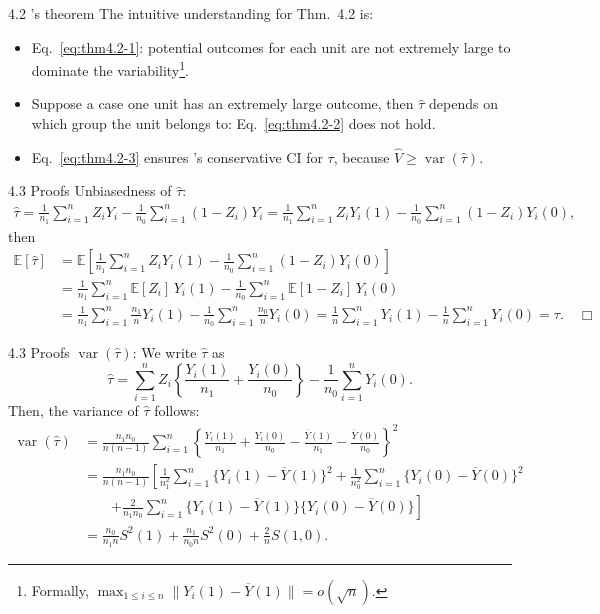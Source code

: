 \documentclass[aspectratio=169, 12pt]{beamer}
\begin{document}
\begin{frame}{4.2 \citet{neyman1923application}'s theorem}
  The intuitive understanding for Thm.~4.2 is:
  \begin{itemize}
    \item Eq.~\eqref{eq:thm4.2-1}: potential outcomes for each unit are not extremely large to dominate the variability\footnote{Formally, $\max_{1\leq i \leq n}\|Y_i(1)-\overline{Y}(1)\|=o(\sqrt{n})$.}. 
    \item Suppose a case one unit has an extremely large outcome, then $\widehat{\tau}$ depends on which group the unit belongs to: Eq.~\eqref{eq:thm4.2-2} does not hold.
    \item Eq.~\eqref{eq:thm4.2-3} ensures \citet{neyman1923application}'s conservative CI for $\tau$, because $\widehat{V}\geq \operatorname{var}(\widehat{\tau})$.
  \end{itemize}
\end{frame}

\begin{frame}{4.3 Proofs}
  Unbiasedness of $\widehat{\tau}$:
  {\small
  \begin{align*}
    \widehat{\tau} 
    = \frac{1}{n_1}\sum_{i=1}^{n}Z_iY_i - \frac{1}{n_0}\sum_{i=1}^{n}(1-Z_i)Y_i
    =\frac{1}{n_1}\sum_{i=1}^{n}Z_iY_i(1) - \frac{1}{n_0}\sum_{i=1}^{n}(1-Z_i)Y_i(0),
  \end{align*}
  then
  \begin{align*}
    \mathbb{E}[\widehat{\tau}] 
    &=\mathbb{E}\left[\frac{1}{n_1}\sum_{i=1}^{n}Z_iY_i(1) - \frac{1}{n_0}\sum_{i=1}^{n}(1-Z_i)Y_i(0)\right] \\
    &=\frac{1}{n_1}\sum_{i=1}^{n}\mathbb{E}[Z_i]\,Y_i(1) - \frac{1}{n_0}\sum_{i=1}^{n}\mathbb{E}[1-Z_i]\,Y_i(0) \\
    &= \frac{1}{n_1}\sum_{i=1}^{n}\frac{n_1}{n}Y_i(1) - \frac{1}{n_0}\sum_{i=1}^{n}\frac{n_0}{n}Y_i(0)
    = \frac{1}{n}\sum_{i=1}^{n}Y_i(1) - \frac{1}{n}\sum_{i=1}^{n}Y_i(0) = \tau. \quad \Box
  \end{align*}
  }
\end{frame}

\begin{frame}{4.3 Proofs}
  $\operatorname{var}(\widehat{\tau})$:
  {\small
  We write $\widehat{\tau}$ as
  \[
  \widehat{\tau} = \sum_{i=1}^{n}Z_i\left\{\frac{Y_i(1)}{n_1}+\frac{Y_i(0)}{n_0}\right\} - \frac{1}{n_0}\sum_{i=1}^{n}Y_i(0).
  \]
  Then, the variance of $\widehat{\tau}$ follows:
  \begin{align*}
    \operatorname{var}(\widehat{\tau}) 
    &= \frac{n_1n_0}{n(n-1)}\sum_{i=1}^{n}\left\{\frac{Y_i(1)}{n_1}+\frac{Y_i(0)}{n_0}-\frac{\overline{Y}(1)}{n_1}-\frac{\overline{Y}(0)}{n_0}\right\}^2\\
    &= \frac{n_1n_0}{n(n-1)}\left[\frac{1}{n_1^2}\sum_{i=1}^{n}\{Y_i(1)-\overline{Y}(1)\}^2+\frac{1}{n_0^2}\sum_{i=1}^{n}\{Y_i(0)-\overline{Y}(0)\}^2\right.\\
    &\qquad\left.+\frac{2}{n_1n_0}\sum_{i=1}^{n}\{Y_i(1)-\overline{Y}(1)\}\{Y_i(0)-\overline{Y}(0)\}\right]\\
    &= \frac{n_0}{n_1n}S^2(1) + \frac{n_1}{n_0n}S^2(0) + \frac{2}{n}S(1,0). 
  \end{align*}
  }
\end{frame}
\end{document}

